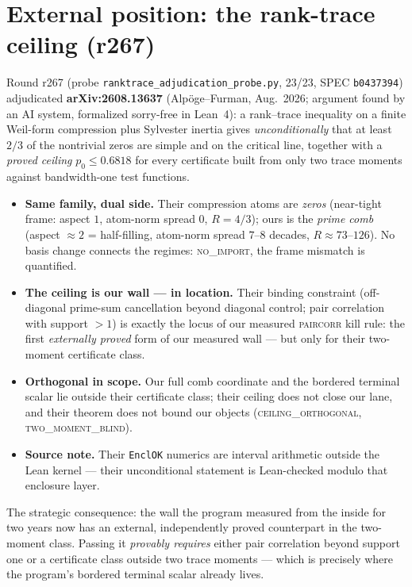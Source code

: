 \documentclass[11pt]{article}
\theoremstyle{definition}
\theoremstyle{remark}
\begin{document}
\section{External position: the rank-trace ceiling (r267)}\label{sec:external}

Round r267 (probe \texttt{ranktrace\_adjudication\_probe.py}, 23/23, SPEC
\texttt{b0437394}) adjudicated \textbf{arXiv:2608.13637} (Alp\"oge--Furman,
Aug.~2026; argument found by an AI system, formalized sorry-free in
Lean~4): a rank--trace inequality on a finite Weil-form compression plus
Sylvester inertia gives \emph{unconditionally} that at least $2/3$ of the
nontrivial zeros are simple and on the critical line, together with a
\emph{proved ceiling} $p_0\le0.6818$ for every certificate built from only
two trace moments against bandwidth-one test functions.

\begin{itemize}[leftmargin=2em]
\item \textbf{Same family, dual side.}  Their compression atoms are
\emph{zeros} (near-tight frame: aspect $1$, atom-norm spread $0$,
$R=4/3$); ours is the \emph{prime comb} (aspect $\approx2$ =
half-filling, atom-norm spread $7$--$8$ decades, $R\approx73$--$126$).
No basis change connects the regimes: \textsc{no\_import}, the frame
mismatch is quantified.
\item \textbf{The ceiling is our wall --- in location.}  Their binding
constraint (off-diagonal prime-sum cancellation beyond diagonal control;
pair correlation with support $>1$) is exactly the locus of our measured
\textsc{paircorr} kill rule: the first \emph{externally proved} form of
our measured wall --- but only for their two-moment certificate class.
\item \textbf{Orthogonal in scope.}  Our full comb coordinate and the
bordered terminal scalar lie outside their certificate class; their
ceiling does not close our lane, and their theorem does not bound our
objects (\textsc{ceiling\_orthogonal}, \textsc{two\_moment\_blind}).
\item \textbf{Source note.}  Their \texttt{EnclOK} numerics are interval
arithmetic outside the Lean kernel --- their unconditional statement is
Lean-checked modulo that enclosure layer.
\end{itemize}

The strategic consequence: the wall the program measured from the inside
for two years now has an external, independently proved counterpart in the
two-moment class.  Passing it \emph{provably requires} either pair
correlation beyond support one or a certificate class outside two trace
moments --- which is precisely where the program's bordered terminal
scalar already lives.
\end{document}
